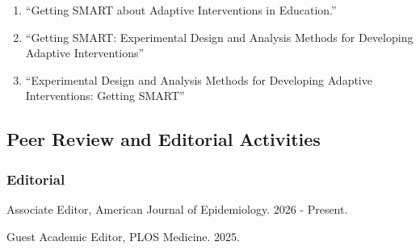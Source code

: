 \documentclass[letterpaper,11pt]{article} %
\begin{document}
\begin{enumerate}
		\item ``Getting SMART about Adaptive Interventions in Education.''
		
		\item ``Getting SMART: Experimental Design and Analysis Methods for Developing Adaptive Interventions''
		
		\item ``Experimental Design and Analysis Methods for Developing Adaptive Interventions: Getting SMART''
	\end{enumerate}
	
	\subsection*{Peer Review and Editorial Activities}
	\subsubsection*{Editorial}
	\begin{etaremune}
        \item Associate Editor, American Journal of Epidemiology. 2026 - Present.
		\item Guest Academic Editor, PLOS Medicine. 2025. 
	\end{etaremune}
	
\end{document}

